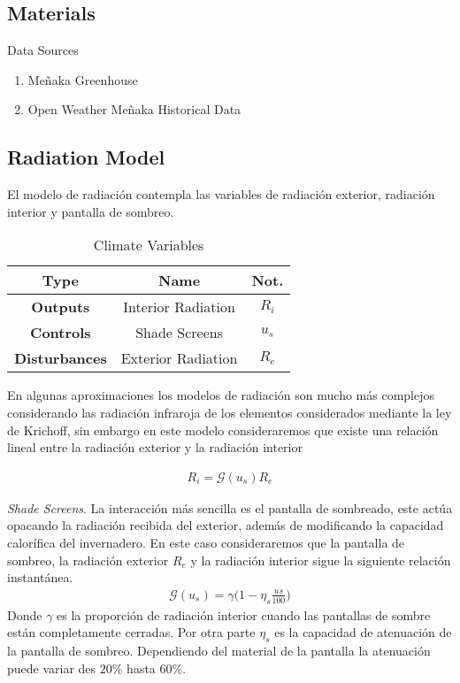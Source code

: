 \documentclass[5p,twocolumn]{elsarticle}
\begin{document}
\subsection{Materials}
Data Sources
\begin{enumerate}
    \item Meñaka Greenhouse
    \item Open Weather Meñaka Historical Data
\end{enumerate}


\subsection{Radiation Model}

El modelo de radiación contempla las variables de radiación exterior, radiación interior y pantalla de sombreo. 
\begin{table}[ht!]
    \centering
    \small
    \begin{tabular}{ccc}
        \textbf{Type} & \textbf{Name} & \textbf{Not.} \\ \hline
        \multirow{1}{*}{\textbf{Outputs}}        & Interior Radiation       & $R_i$ \\ \hline
        \multirow{1}{*}{\textbf{Controls}}       & Shade Screens            & $u_s$ \\ \hline   
        \multirow{1}{*}{\textbf{Disturbances}}   & Exterior Radiation       & $R_e$ \\ \hline
    \end{tabular}
    \caption{Climate Variables}
\end{table}

En algunas aproximaciones los modelos de radiación son mucho más complejos considerando las radiación infraroja de los elementos considerados mediante la ley de Krichoff, sin embargo en este modelo consideraremos que existe una relación lineal entre la radiación exterior y la radiación interior 

\begin{gather}
    R_i = \mathcal{G}(u_s)R_e
\end{gather}

\textit{Shade Screens}. La interacción más sencilla es el pantalla de sombreado, este actúa opacando la radiación recibida del exterior, además de modificando la capacidad calorífica del invernadero. En este caso consideraremos que la pantalla de sombreo, la radiación exterior $R_e$ y la radiación interior sigue la siguiente relación instantánea. 
\begin{gather}
    \mathcal{G}(u_s)  =\gamma\Big(1-\eta_{s}\frac{us}{100} \Big)
\end{gather}
Donde $\gamma$ es la  proporción de radiación interior cuando las pantallas de sombre están completamente cerradas. Por otra parte $\eta_s$ es la capacidad de atenuación de la pantalla de sombreo. Dependiendo del material de la pantalla la atenuación puede variar des $20\%$ hasta $60\%$.
\end{document}
